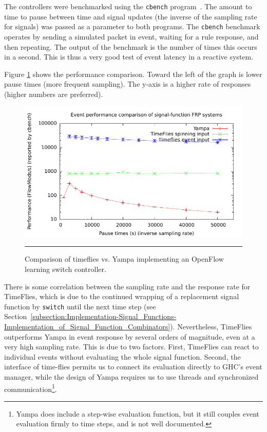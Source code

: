 The controllers were benchmarked using the {\tt cbench} program~\cite{cbench}. The
amount to time to pause between time and signal updates (the inverse of the sampling rate for signals)
was passed as a parameter to both programs. The {\tt cbench} benchmark operates by sending a simulated packet in
event, waiting for a rule response, and then repeating. The output of the benchmark
is the number of times this occurs in a second. This is thus a very good test of
event latency in a reactive system.

Figure \ref{fig:timeflies-yampa-comparison} shows the performance comparison.
Toward the left of the graph is lower pause times (more frequent sampling). The
y-axis is a higher rate of responses (higher numbers are preferred). 

\begin{figure}
\includegraphics{graph}
\hrule
\caption{Comparison of timeflies vs. Yampa implementing an OpenFlow learning switch controller.}
\label{fig:timeflies-yampa-comparison}
\end{figure}

There is some correlation between the sampling rate and the response rate
for TimeFlies, which is due to the continued wrapping of a replacement signal
function by {\tt switch} until the next time step (see Section~\ref{subsection:Implementation-Signal_Functions-Implementation_of_Signal_Function_Combinators}).
Nevertheless, TimeFlies outperforms Yampa in event response by several orders of magnitude,
even at a very high sampling rate. This is due to two factors. First, TimeFlies can react
to individual events without evaluating the whole signal function. Second, the
interface of time-flies permits us to connect its evaluation directly to GHC's event
manager, while the design of Yampa requires us to use threads and synchronized
communication\footnote{Yampa does include a step-wise evaluation function, but
it still couples event evaluation firmly to time steps, and is not well
documented.}.

